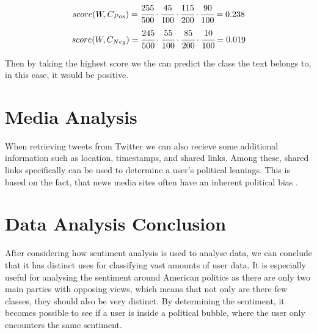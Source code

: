 \begin{equation}\label{e:Pos}
score(W, C_{Pos}) = \cfrac{255}{500} \cdot \cfrac{45}{100} \cdot
\cfrac{115}{200} \cdot \cfrac{90}{100} = 0.238
\end{equation}
\begin{equation}\label{e:Neg}
score(W, C_{Neg}) = \cfrac{245}{500} \cdot \cfrac{55}{100} \cdot \cfrac{85}{200}
\cdot \cfrac{10}{100} = 0.019
\end{equation}

Then by taking the highest score we the can predict the class the text belongs
to, in this case, it would be positive.

\section{Media Analysis}\label{sec:mediaAnalysis}
When retrieving tweets from Twitter we can also recieve some additional
information such as location, timestamps, and shared links. Among these, shared
links specifically can be used to determine a user's political leanings. This is
based on the fact, that news media sites often have an inherent political bias
\citep{allSidesMedia}.

\section{Data Analysis Conclusion}\label{sec:DAConc}
After considering how sentiment analysis is used to analyse data, we can
conclude that it has distinct uses for classifying vast amounts of user data. It
is especially useful for analysing the sentiment around American politics as
there are only two main parties with opposing views, which means that not only
are there few classes, they should also be very distinct. By determining the
sentiment, it becomes possible to see if a user is inside a political bubble,
where the user only encounters the same sentiment.



